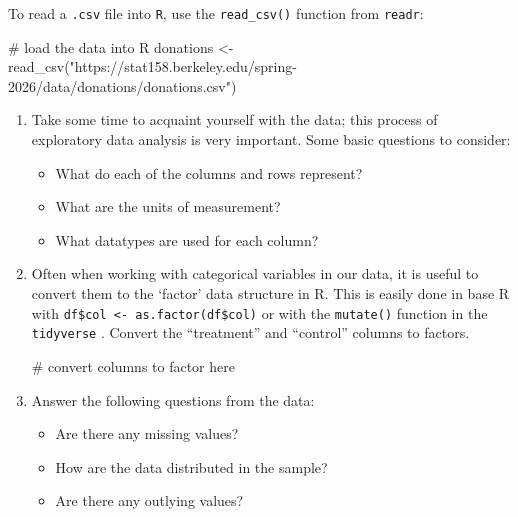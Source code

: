 \documentclass[
  letterpaper,
  DIV=11,
  numbers=noendperiod]{scrartcl}
\newenvironment{Shaded}{\begin{snugshade}}{\end{snugshade}}
\newcommand{\CommentTok}[1]{\textcolor[rgb]{0.37,0.37,0.37}{#1}}
\newcommand{\FunctionTok}[1]{\textcolor[rgb]{0.28,0.35,0.67}{#1}}
\newcommand{\NormalTok}[1]{\textcolor[rgb]{0.00,0.23,0.31}{#1}}
\newcommand{\OtherTok}[1]{\textcolor[rgb]{0.00,0.23,0.31}{#1}}
\newcommand{\StringTok}[1]{\textcolor[rgb]{0.13,0.47,0.30}{#1}}
\providecommand{\tightlist}{%
  \setlength{\itemsep}{0pt}\setlength{\parskip}{0pt}}
\begin{document}
To read a \texttt{.csv} file into \texttt{R}, use the
\texttt{read\_csv()} function from \texttt{readr}:

\begin{Shaded}
\begin{Highlighting}[]
\CommentTok{\# load the data into R}
\NormalTok{donations }\OtherTok{\textless{}{-}} \FunctionTok{read\_csv}\NormalTok{(}\StringTok{"https://stat158.berkeley.edu/spring{-}2026/data/donations/donations.csv"}\NormalTok{)}
\end{Highlighting}
\end{Shaded}

\begin{enumerate}
\def\labelenumi{\arabic{enumi}.}
\setcounter{enumi}{5}
\item
  Take some time to acquaint yourself with the data; this process of
  exploratory data analysis is very important. Some basic questions to
  consider:

  \begin{itemize}
  \tightlist
  \item
    What do each of the columns and rows represent?
  \item
    What are the units of measurement?
  \item
    What datatypes are used for each column?
  \end{itemize}
\item
  Often when working with categorical variables in our data, it is
  useful to convert them to the `factor' data structure in R. This is
  easily done in base R with
  \texttt{df\$col\ \textless{}-\ as.factor(df\$col)} or with the
  \texttt{mutate()} function in the \texttt{tidyverse} . Convert the
  ``treatment'' and ``control'' columns to factors.

\begin{Shaded}
\begin{Highlighting}[]
\CommentTok{\# convert columns to factor here}
\end{Highlighting}
\end{Shaded}
\item
  Answer the following questions from the data:

  \begin{itemize}
  \tightlist
  \item
    Are there any missing values?
  \item
    How are the data distributed in the sample?
  \item
    Are there any outlying values?
  \end{itemize}


\end{enumerate}
\end{document}
